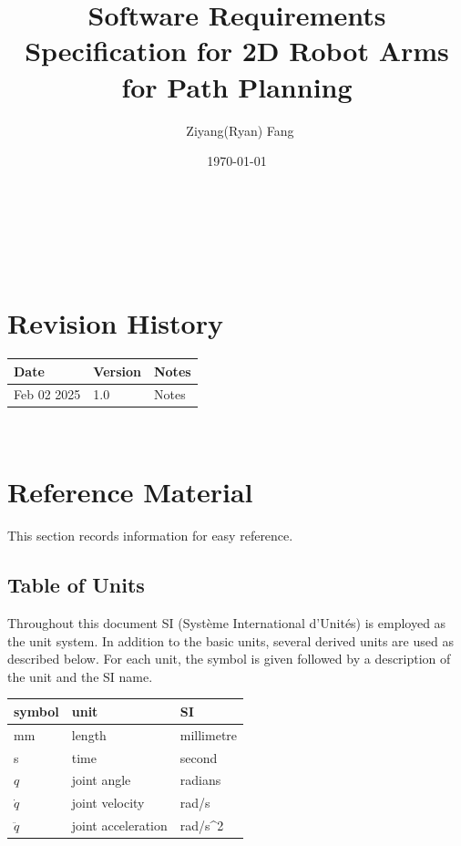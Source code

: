 \documentclass[12pt]{article}
\begin{document}
\title{Software Requirements Specification for 2D Robot Arms for Path Planning} 
\author{\ Ziyang(Ryan) Fang}
\date{\today}
	
\maketitle

~\newpage


\tableofcontents

~\newpage

\section*{Revision History}

\begin{tabularx}{\textwidth}{p{3cm}p{2cm}X}
\toprule {\bf Date} & {\bf Version} & {\bf Notes}\\
\midrule
Feb 02 2025 & 1.0 & Notes\\
\bottomrule
\end{tabularx}



~\newpage

\section{Reference Material}

This section records information for easy reference.

\subsection{Table of Units}

Throughout this document SI (Syst\`{e}me International d'Unit\'{e}s) is employed
as the unit system.  In addition to the basic units, several derived units are
used as described below.  For each unit, the symbol is given followed by a
description of the unit and the SI name.
~\newline

\renewcommand{\arraystretch}{1.2}
  \noindent \begin{tabular}{l l l} 
    \toprule		
    \textbf{symbol} & \textbf{unit} & \textbf{SI}\\
    \midrule 
    \si{\milli\metre} & length & millimetre \\
    \si{\second} & time & second \\
    \( q \) & joint angle & radians \\
    \(\dot{q}\) & joint velocity & rad/s \\
    \(\ddot{q}\) & joint acceleration & rad/s^2 \\
    \bottomrule
  \end{tabular}
\end{document}
